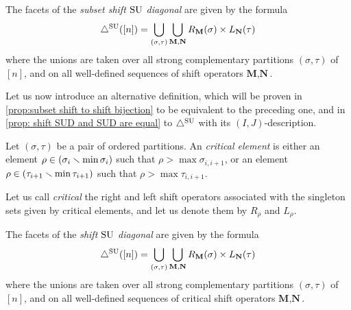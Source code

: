 \begin{definition}
   The facets of the \emph{subset shift $\mathrm{SU}$ diagonal} are given by the formula
    \begin{align*}
        \triangle^{\mathrm{SU}}([n]) = \bigcup_{(\sigma,\tau)} \bigcup_{\mathbf{M}, \mathbf{N}} R_\mathbf{M}(\sigma)\times L_\mathbf{N}(\tau)
    \end{align*}
    where the unions are taken over all strong complementary partitions $(\sigma, \tau)$ of $[n]$, and on all well-defined sequences of shift operators $\textbf{M},\textbf{N}$.
\end{definition}

Let us now introduce an alternative definition, which will be proven in \cref{prop:subset shift to shift bijection} to be equivalent to the preceding one, and in \cref{prop: shift SUD and SUD are equal} to $\triangle^{\mathrm{SU}}$ with its $(I,J)$-description. 

\begin{definition} \label{def:critical SU shift}
    Let $(\sigma,\tau)$ be a pair of ordered partitions.
    An \emph{critical element} is either an element $\rho \in (\sigma_i \smallsetminus \min \sigma_i)$ such that $\rho>\max \sigma_{i,i+1}$, or an element $\rho \in (\tau_{i+1} \smallsetminus \min\tau_{i+1})$ such that $\rho > \max \tau_{i,i+1}$. 
\end{definition}

Let us call \emph{critical} the right and left shift operators associated with the singleton sets given by critical elements, and let us denote them by $R_{\rho}$ and $L_{\rho}$.

\begin{definition}
    The facets of the \emph{shift $\mathrm{SU}$ diagonal} are given by the formula
    \begin{align*}
        \triangle^{\mathrm{SU}}([n]) = \bigcup_{(\sigma,\tau)} \bigcup_{\mathbf{M}, \mathbf{N}} R_\mathbf{M}(\sigma)\times L_\mathbf{N}(\tau)
    \end{align*}
    where the unions are taken over all strong complementary partitions $(\sigma, \tau)$ of $[n]$, and on all well-defined sequences of critical shift operators $\textbf{M},\textbf{N}$.
\end{definition}


